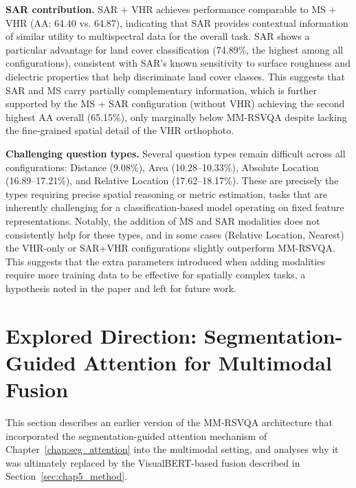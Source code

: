 \textbf{SAR contribution.}
SAR + VHR achieves performance comparable to MS + VHR
(AA: 64.40 vs. 64.87), indicating that SAR provides
contextual information of similar utility to
multispectral data for the overall task. SAR shows a
particular advantage for land cover classification
(74.89\%, the highest among all configurations),
consistent with SAR's known sensitivity to surface
roughness and dielectric properties that help
discriminate land cover classes. This suggests that
SAR and MS carry partially complementary information,
which is further supported by the MS + SAR
configuration (without VHR) achieving the second
highest AA overall (65.15\%), only marginally below
MM-RSVQA despite lacking the fine-grained spatial
detail of the VHR orthophoto.

\textbf{Challenging question types.}
Several question types remain difficult across all
configurations: Distance (9.08\%), Area (10.28--10.33\%),
Absolute Location (16.89--17.21\%), and Relative
Location (17.62--18.17\%). These are precisely the
types requiring precise spatial reasoning or metric
estimation, tasks that are inherently challenging
for a classification-based model operating on fixed
feature representations. Notably, the addition of
MS and SAR modalities does not consistently help for
these types, and in some cases (Relative Location,
Nearest) the VHR-only or SAR+VHR configurations
slightly outperform MM-RSVQA. This suggests that
the extra parameters introduced when adding modalities
require more training data to be effective for
spatially complex tasks, a hypothesis noted in the
paper and left for future work.

\section{Explored Direction: Segmentation-Guided Attention
for Multimodal Fusion}
\label{sec:chap5_seg_attention_multimodal}

This section describes an earlier version of the MM-RSVQA
architecture that incorporated the segmentation-guided
attention mechanism of Chapter~\ref{chap:seg_attention}
into the multimodal setting, and analyses why it was
ultimately replaced by the VisualBERT-based fusion
described in Section~\ref{sec:chap5_method}.

